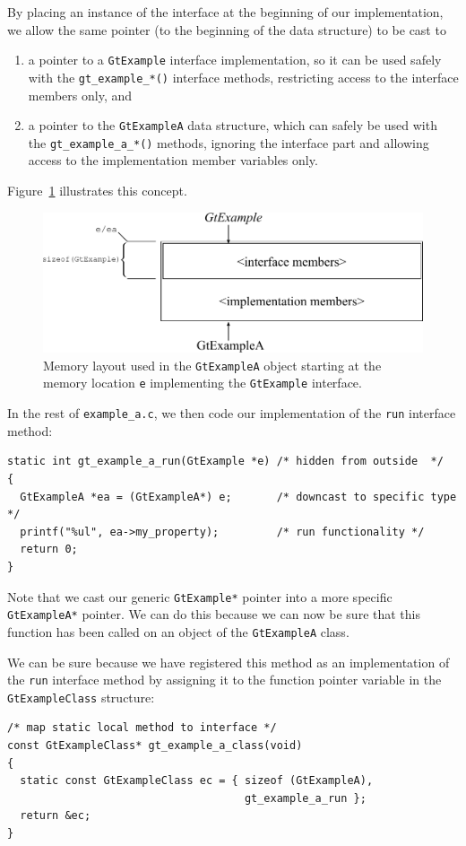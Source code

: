 \documentclass[11pt,final]{article}
\newcommand{\keyword}[1]{\lstinline{#1}}
\begin{document}
By placing an instance of the interface at the beginning of our implementation,
we allow the same pointer (to the beginning of the data structure) to be cast to
\begin{enumerate}
\item
a pointer to a \keyword{GtExample} interface implementation, so it can be used
safely with the \keyword{gt_example_*()} interface methods, restricting access
to the interface members only, and
\item
a pointer to the \keyword{GtExampleA} data structure, which can safely be used
with the \keyword{gt_example_a_*()} methods, ignoring the interface part and
allowing access to the implementation member variables only.
\end{enumerate}
Figure~\ref{fig:interfacememlayout} illustrates this concept.

\begin{figure}
\begin{center}
\includegraphics[width=.7\textwidth]{mlayout}
\end{center}
\caption{Memory layout used in the \keyword{GtExampleA} object starting at the
 memory location \keyword{e} implementing the \keyword{GtExample} interface.}
\label{fig:interfacememlayout}
\end{figure}

In the rest of \keyword{example_a.c}, we then code our implementation of the
\keyword{run} interface method:

\begin{lstlisting}
static int gt_example_a_run(GtExample *e) /* hidden from outside  */
{
  GtExampleA *ea = (GtExampleA*) e;       /* downcast to specific type */
  printf("%ul", ea->my_property);         /* run functionality */
  return 0;
}
\end{lstlisting}

Note that we cast our generic \keyword{GtExample*} pointer into a more specific
\keyword{GtExampleA*} pointer. We can do this because we can now be sure that
this function has been called on an object of the \keyword{GtExampleA} class.

We can be sure because we have registered this method as an implementation of
the \keyword{run} interface method by assigning it to the function pointer
variable in the \keyword{GtExampleClass} structure:
\begin{lstlisting}
/* map static local method to interface */
const GtExampleClass* gt_example_a_class(void)
{
  static const GtExampleClass ec = { sizeof (GtExampleA),
                                     gt_example_a_run };
  return &ec;
}
\end{lstlisting}
\end{document}
